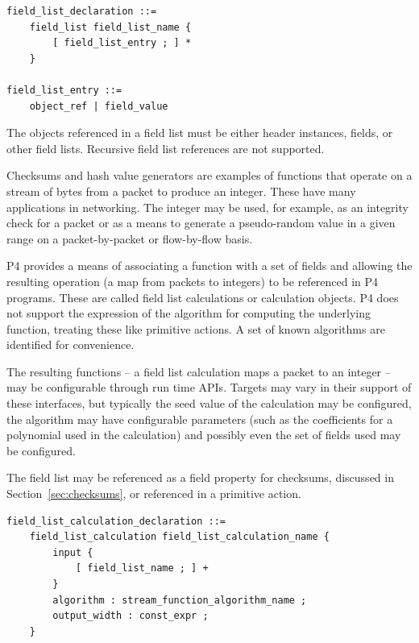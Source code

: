 \documentclass[12pt]{article}
\begin{document}
\begin{lstlisting}[style=BNFstyle]
field_list_declaration ::=
    field_list field_list_name {
        [ field_list_entry ; ] *
    }

field_list_entry ::= 
    object_ref | field_value
\end{lstlisting}

The objects referenced in a field list must be either header instances,
fields, or other field lists. Recursive field list references are not
supported.


Checksums and hash value generators are examples of functions that operate on a
stream of bytes from a packet to produce an integer. These have many
applications in networking. The integer may be used, for example, as an
integrity check for a packet or as a means to generate a pseudo-random value in
a given range on a packet-by-packet or flow-by-flow basis.

P4 provides a means of associating a function with a set of fields and
allowing the resulting operation (a map from packets to integers) to
be referenced in P4 programs.  These are called field list
calculations or calculation objects.  P4 does not support the
expression of the algorithm for computing the underlying function,
treating these like primitive actions. A set of known algorithms are
identified for convenience.

The resulting functions -- a field list calculation maps a packet to
an integer -- may be configurable through run time APIs. Targets may
vary in their support of these interfaces, but typically the seed
value of the calculation may be configured, the algorithm may have
configurable parameters (such as the coefficients for a polynomial
used in the calculation) and possibly even the set of fields used may
be configured.

The field list may be referenced as a field property for checksums,
discussed in Section~\ref{sec:checksums}, or referenced in a primitive action.

\begin{lstlisting}[style=BNFstyle]
field_list_calculation_declaration ::=
    field_list_calculation field_list_calculation_name {
        input {
            [ field_list_name ; ] +
        }
        algorithm : stream_function_algorithm_name ;
        output_width : const_expr ;
    }
\end{lstlisting}
\end{document}
